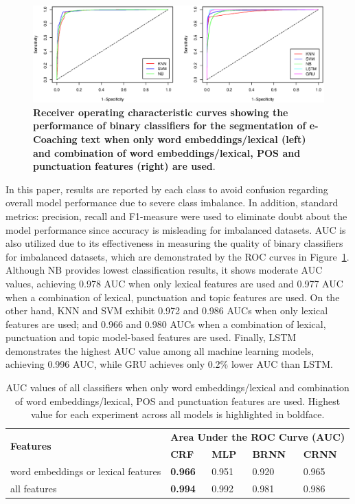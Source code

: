 \documentclass{amia}
\begin{document}
\begin{figure}[!htb]
    \centering
    \includegraphics[width=1.0\textwidth]{figures/roc-curves.eps}
    \caption{\textbf{Receiver operating characteristic curves showing the performance of binary classifiers for the segmentation of e-Coaching text when only word embeddings/lexical (left) and combination of word embeddings/lexical, POS and punctuation features (right) are used}.}
    \label{fig:roc-curves}
\end{figure}

In this paper, results are reported by each class to avoid confusion regarding overall model performance due to severe class imbalance. In addition, standard metrics: precision, recall and F1-measure were used to eliminate doubt about the model performance since accuracy is misleading for imbalanced datasets. AUC is also utilized due to its effectiveness in measuring the quality of binary classifiers for imbalanced datasets\cite{hu2015kernelized}, which are demonstrated by the ROC curves in Figure~\ref{fig:roc-curves}. Although NB provides lowest classification results, it shows moderate AUC values, achieving 0.978 AUC when only lexical features are used and 0.977 AUC when a combination of lexical, punctuation and topic features are used. On the other hand, KNN and SVM exhibit 0.972 and 0.986 AUCs when only lexical features are used; and 0.966 and 0.980 AUCs when a combination of lexical, punctuation and topic model-based features are used. Finally, LSTM demonstrates the highest AUC value among all machine learning models, achieving 0.996 AUC, while GRU achieves only 0.2\% lower AUC than LSTM.   

\begin{table}[ht]
\centering
\caption{AUC values of all classifiers when only word embeddings/lexical and combination of word embeddings/lexical, POS and punctuation features are used. Highest value for each experiment across all models is highlighted in boldface.}
\label{tab:result_roc}
 \begin{tabular}{|l|l|l|l|l|}
  \hline
\multirow{2}{*}{\textbf{Features}} & \multicolumn{4}{|c|}{\textbf{Area Under the ROC Curve (AUC)}} \\\cline{2-5}
 & \textbf{CRF} & \textbf{MLP}  & \textbf{BRNN} & \textbf{CRNN} \\ \hline      
 word embeddings or lexical features & \textbf{0.966} & 0.951 & 0.920 & 0.965 \\ \hline
 all features & \textbf{0.994} & 0.992 & 0.981 & 0.986 \\ \hline
  \end{tabular}
\end{table}      
\end{document}
